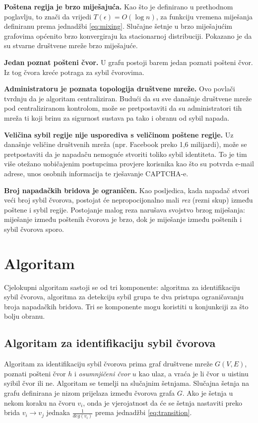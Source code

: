 \documentclass[times, utf8, seminar, numeric]{fer}
\begin{document}
\textbf{Poštena regija je brzo miješajuća.} Kao što je definirano u prethodnom poglavlju, to znači da vrijedi $T(\epsilon) = O(\log n)$, za funkciju vremena miješanja definiranu prema jednadžbi \ref{eq:mixing}. Slučajne šetnje u brzo miješajućim grafovima općenito brzo konvergiraju ka stacionarnoj distribuciji. \cite{sybil-defender} Pokazano je da su stvarne društvene mreže brzo miješajuće. \cite{sybil-limit}

\textbf{Jedan poznat pošteni čvor.} U grafu postoji barem jedan poznati pošteni čvor. Iz tog čvora kreće potraga za sybil čvorovima.

\textbf{Administratoru je poznata topologija društvene mreže.} Ovo povlači tvrdnju da je algoritam centraliziran. Budući da su sve današnje društvene mreže pod centraliziranom kontrolom, može se pretpostaviti da su administratori tih mreža ti koji brinu za sigurnost sustava pa tako i obranu od sybil napada.

\textbf{Veličina sybil regije nije usporediva s veličinom poštene regije.} Uz današnje veličine društvenih mreža (npr. Facebook preko 1,6 milijardi), može se pretpostaviti da je napadaču nemoguće stvoriti toliko sybil identiteta. To je tim više otežano uobičajenim postupcima provjere korisnika kao što su potvrda e-mail adrese, unos osobnih informacija te rješavanje CAPTCHA-e.

\textbf{Broj napadačkih bridova je ograničen.} Kao posljedica, kada napadač stvori veći broj sybil čvorova, postojat će nepropocijonalno mali \textit{rez} (rezni skup) između poštene i sybil regije. Postojanje malog reza narušava svojstvo brzog miješanja: miješanje između poštenih čvorova je brzo, dok je miješanje između poštenih i sybil čvorova sporo.

\section{Algoritam}
Cjelokupni algoritam sastoji se od tri komponente: algoritma za identifikaciju sybil čvorova, algoritma za detekciju sybil grupa te dva pristupa ograničavanju broja napadačkih bridova. Tri se komponente mogu koristiti u konjunkciji za što bolju obranu. \cite{sybil-defender}

\subsection{Algoritam za identifikaciju sybil čvorova}
Algoritam za identifikaciju sybil čvorova prima graf društvene mreže $G(V, E)$, poznati pošteni čvor $h$ i \textit{osumnjičeni čvor}  $u$ kao ulaz, a vraća je li čvor $u$ uistinu syibil čvor ili ne. Algoritam se temelji na slučajnim šetnjama. Slučajna šetnja na grafu definirana je nizom prijelaza između čvorova grafa $G$. Ako je šetnja u nekom koraku na čvoru $v_i$, onda je vjerojatnost da će se šetnja nastaviti preko brida $v_i \to v_j$ jednaka $\frac{1}{deg(v_i)}$ prema jednadžbi \ref{eq:transition}.
\end{document}
